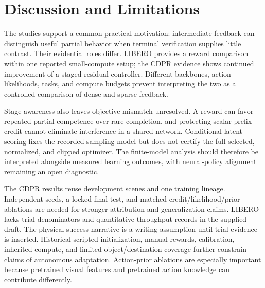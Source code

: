 \section{Discussion and Limitations}\label{sec:discussion}
The studies support a common practical motivation: intermediate feedback can distinguish useful partial behavior when terminal verification supplies little contrast. Their evidential roles differ. LIBERO provides a reward comparison within one reported small-compute setup; the CDPR evidence shows continued improvement of a staged residual controller. Different backbones, action likelihoods, tasks, and compute budgets prevent interpreting the two as a controlled comparison of dense and sparse feedback.

Stage awareness also leaves objective mismatch unresolved. A reward can favor repeated partial competence over rare completion, and protecting scalar prefix credit cannot eliminate interference in a shared network. Conditional latent scoring fixes the recorded sampling model but does not certify the full selected, normalized, and clipped optimizer. The finite-model analysis should therefore be interpreted alongside measured learning outcomes, with neural-policy alignment remaining an open diagnostic.

The CDPR results reuse development scenes and one training lineage. Independent seeds, a locked final test, and matched credit/likelihood/prior ablations are needed for stronger attribution and generalization claims. LIBERO lacks trial denominators and quantitative throughput records in the supplied draft. The physical success narrative is a writing assumption until trial evidence is inserted. Historical scripted initialization, manual rewards, calibration, inherited compute, and limited object/destination coverage further constrain claims of autonomous adaptation. Action-prior ablations are especially important because pretrained visual features and pretrained action knowledge can contribute differently.
